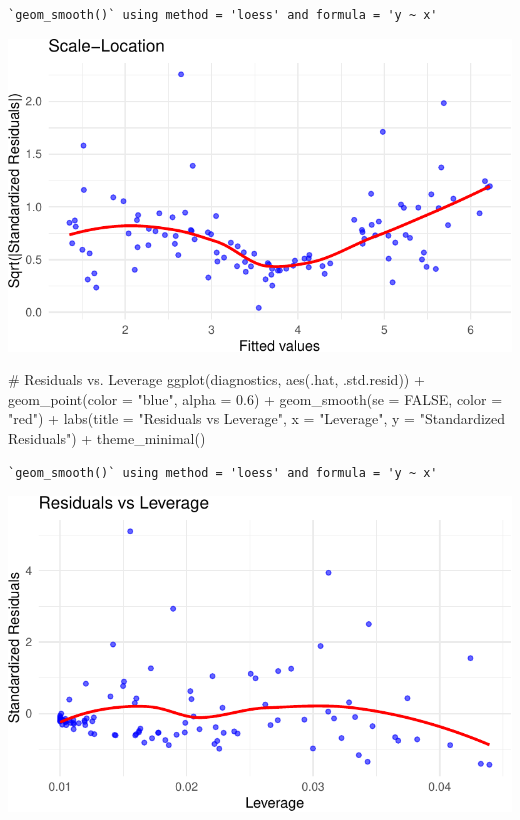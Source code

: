 \documentclass[
  11pt,
]{article}
\newenvironment{Shaded}{\begin{snugshade}}{\end{snugshade}}
\newcommand{\AttributeTok}[1]{\textcolor[rgb]{0.40,0.45,0.13}{#1}}
\newcommand{\CommentTok}[1]{\textcolor[rgb]{0.37,0.37,0.37}{#1}}
\newcommand{\ConstantTok}[1]{\textcolor[rgb]{0.56,0.35,0.01}{#1}}
\newcommand{\FloatTok}[1]{\textcolor[rgb]{0.68,0.00,0.00}{#1}}
\newcommand{\FunctionTok}[1]{\textcolor[rgb]{0.28,0.35,0.67}{#1}}
\newcommand{\NormalTok}[1]{\textcolor[rgb]{0.00,0.23,0.31}{#1}}
\newcommand{\SpecialCharTok}[1]{\textcolor[rgb]{0.37,0.37,0.37}{#1}}
\newcommand{\StringTok}[1]{\textcolor[rgb]{0.13,0.47,0.30}{#1}}
\begin{document}
\begin{verbatim}
`geom_smooth()` using method = 'loess' and formula = 'y ~ x'
\end{verbatim}

\includegraphics{HW-4-CODE-and-ANSWERS_files/figure-pdf/unnamed-chunk-3-1.pdf}

\begin{Shaded}
\begin{Highlighting}[]
\CommentTok{\# Residuals vs. Leverage}
\FunctionTok{ggplot}\NormalTok{(diagnostics, }\FunctionTok{aes}\NormalTok{(.hat, .std.resid)) }\SpecialCharTok{+}
  \FunctionTok{geom\_point}\NormalTok{(}\AttributeTok{color =} \StringTok{"blue"}\NormalTok{, }\AttributeTok{alpha =} \FloatTok{0.6}\NormalTok{) }\SpecialCharTok{+}
  \FunctionTok{geom\_smooth}\NormalTok{(}\AttributeTok{se =} \ConstantTok{FALSE}\NormalTok{, }\AttributeTok{color =} \StringTok{"red"}\NormalTok{) }\SpecialCharTok{+}
  \FunctionTok{labs}\NormalTok{(}\AttributeTok{title =} \StringTok{"Residuals vs Leverage"}\NormalTok{, }\AttributeTok{x =} \StringTok{"Leverage"}\NormalTok{, }\AttributeTok{y =} \StringTok{"Standardized Residuals"}\NormalTok{) }\SpecialCharTok{+}
  \FunctionTok{theme\_minimal}\NormalTok{()}
\end{Highlighting}
\end{Shaded}

\begin{verbatim}
`geom_smooth()` using method = 'loess' and formula = 'y ~ x'
\end{verbatim}

\includegraphics{HW-4-CODE-and-ANSWERS_files/figure-pdf/unnamed-chunk-4-1.pdf}
\end{document}
